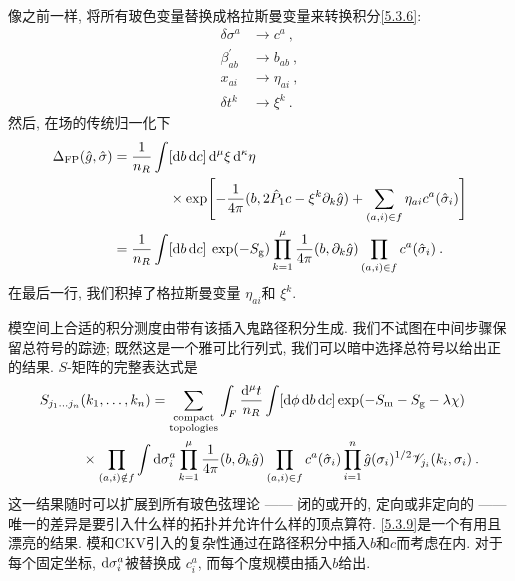 像之前一样, 将所有玻色变量替换成格拉斯曼变量来转换积分\eqref{5.3.6}:
\begin{subequations} \label{5.3.7}
\begin{align}
\delta \sigma^{a}  &\rightarrow c^{a} \:, \label{5.3.7a} \\
\beta_{a b}^{\prime} & \rightarrow b_{a b} \:,  \label{5.3.7b}\\
x_{a i}  &\rightarrow \eta_{a i}  \:,\label{5.3.7c} \\
\delta t^{k}  &\rightarrow \xi^{k} \:. \label{5.3.7d}
\end{align}	
\end{subequations}
然后, 在场的传统归一化下
	\begin{align}
		\Delta_{\mathrm{FP}}(\hat{g}, \hat{\sigma})&= \frac{1}{n_{R}} \int[\mathrm{d} b\, \mathrm{d} c] \,\mathrm{d}^{\mu} \xi \,\mathrm{d}^{\kappa} \eta \nonumber \\
		&\qquad \qquad \times \exp \Biggl[-\frac{1}{4 \pi}(b, 2 \hat{P}_{1} c-\xi^{k} \partial_{k} \hat{g})
		+\sum_{(a, i) \in f} \eta_{a i} c^{a}(\hat{\sigma}_{i})\Biggr]  \nonumber \\
		&= \frac{1}{n_{R}} \int[\mathrm{d} b\, \mathrm{d} c] \: \exp (-S_{\mathrm{g}}) \prod_{k=1}^{\mu} \frac{1}{4 \pi}(b, \partial_{k} \hat{g}) 
		\prod_{(a, i) \in f} c^{a}(\hat{\sigma}_{i}) \:. \label{5.3.8}
	\end{align}
在最后一行, 我们积掉了格拉斯曼变量 $\eta_{a i}$和 $\xi^{k}$.

模空间上合适的积分测度由带有该插入鬼路径积分生成. 我们不试图在中间步骤保留总符号的踪迹; 既然这是一个雅可比行列式, 我们可以暗中选择总符号以给出正的结果. 
$S$-矩阵的完整表达式是
	\begin{align}
		&S_{j_{1} \ldots j_{n}}(k_{1}, \ldots, k_{n})
		=\sum_{\substack{\text{compact} \\ \text{topologies}}} \int_{F} \frac{\mathrm{d}^{\mu} t}{n_{R}} \int[\mathrm{d} \phi \,\mathrm{d} b\, \mathrm{d} c] \exp (-S_{\mathrm{m}}-S_{\mathrm{g}}-\lambda \chi) \nonumber  \\
		&\qquad \quad \times \prod_{(a, i) \notin f} \int \mathrm{d} \sigma_{i}^{a} \prod_{k=1}^{\mu} \frac{1}{4 \pi}(b, \partial_{k} \hat{g}) 
		\prod_{(a, i) \in f} c^{a}(\hat{\sigma}_{i}) \prod_{i=1}^{n} \hat{g}(\sigma_{i})^{1 / 2} \mathscr{V}_{j_{i}}(k_{i}, \sigma_{i})\:.\label{5.3.9}
	\end{align}
这一结果随时可以扩展到所有玻色弦理论 —— 闭的或开的, 定向或非定向的 —— 唯一的差异是要引入什么样的拓扑并允许什么样的顶点算符. \eqref{5.3.9}是一个有用且漂亮的结果. 模和CKV引入的复杂性通过在路径积分中插入$b$和$c$而考虑在内. 对于每个固定坐标, $\mathrm{d} \sigma_{i}^{a}$被替换成 $c_{i}^{a}$, 而每个度规模由插入$b$给出.

